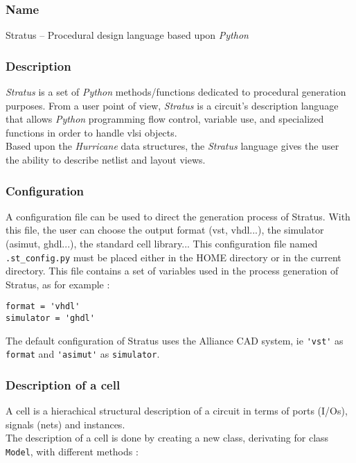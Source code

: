 \subsubsection{Name}

Stratus -- Procedural design language based upon \emph{Python}

\subsubsection{Description}

\emph{Stratus} is a set of \emph{Python} methods/functions dedicated to procedural generation purposes. From a user point of view, \emph{Stratus} is a circuit's description  language that allows \emph{Python} programming flow control, variable use, and specialized functions in order to handle vlsi objects.\\

\indent Based upon the \emph{Hurricane} data structures, the \emph{Stratus} language gives the user the ability to describe netlist and layout views.

\subsubsection{Configuration}
A configuration file can be used to direct the generation process of Stratus. With this file, the user can choose the output format (vst, vhdl...), the simulator (asimut, ghdl...), the standard cell library... This configuration file named \verb-.st_config.py- must be placed either in the HOME directory or in the current directory. This file contains a set of variables used in the process generation of Stratus, as for example :
\begin{verbatim} 
format = 'vhdl'
simulator = 'ghdl'
\end{verbatim} 
The default configuration of Stratus uses the Alliance CAD system, ie \verb-'vst'- as \verb-format- and \verb-'asimut'- as \verb-simulator-.

\subsubsection{Description of a cell}

A cell is a hierachical structural description of a circuit in terms of ports (I/Os), signals (nets) and instances.\\
     
\indent The description of a cell is done by creating a new class, derivating for class \verb-Model-, with different methods :

